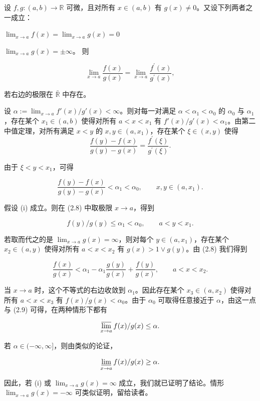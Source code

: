 \begin{proposition}

设 $ f, g: (a, b) \to \mathbb{R} $ 可微，且对所有 $ x \in (a, b) $ 有 $ g(x) \neq 0 $。又设下列两者之一成立：

\begin{subitems}
\item

$ \lim_{x \to a} f(x) = \lim_{x \to a} g(x) = 0 $

\item

$ \lim_{x \to a} g(x) = \pm \infty $。
则

\[
\lim_{x\to a}\frac{f(x)}{g(x)}=\lim_{x\to a}\frac{f^{\prime}(x)}{g^{\prime}(x)},
\]

若右边的极限在 $ \bar{\mathbb{R}} $ 中存在。

\proofhead
设 $\alpha := \lim_{x \to a} f'(x) / g'(x) < \infty$。则对每一对满足 $\alpha < \alpha_1 < \alpha_0$ 的 $\alpha_0$ 与 $\alpha_1$，存在某个 $x_1 \in (a, b)$ 使得对所有 $a < x < x_1$ 有 $f'(x) / g'(x) < \alpha_1$。由第二中值定理，对所有满足 $x < y$ 的 $x, y \in (a, x_1)$，存在某个 $\xi \in (x, y)$ 使得
\begin{equation}
\frac{f(y)-f(x)}{g(y)-g(x)}=\frac{f^{\prime}(\xi)}{g^{\prime}(\xi)}.
\end{equation}

由于 $ \xi < y < x_{1} $，可得

\[
\frac{f(y)-f(x)}{g(y)-g(x)}<\alpha_{1}<\alpha_{0},\qquad x,y\in(a,x_{1}).
\]

假设 (i) 成立。则在 (2.8) 中取极限 $ x \to a $，得到

\begin{equation}
f(y)/g(y)\leq\alpha_{1}<\alpha_{0},\qquad a<y<x_{1}.
\end{equation}

若取而代之的是 $ \lim_{x \to a} g(x) = \infty $，则对每个 $ y \in (a, x_1) $，存在某个 $ x_2 \in (a, y) $ 使得对所有 $ a < x < x_2 $ 有 $ g(x) > 1 \lor g(y) $。由 (2.8) 我们得到

\[
\frac{f(x)}{g(x)}<\alpha_{1}-\alpha_{1}\frac{g(y)}{g(x)}+\frac{f(y)}{g(x)},\qquad a<x<x_{2}.
\]

当 $x \to a$ 时，这个不等式的右边收敛到 $\alpha_1$。因此存在某个 $x_3 \in (a, x_2)$ 使得对所有 $a < x < x_3$ 有 $f(x)/g(x) < \alpha_0$。由于 $\alpha_0$ 可取得任意接近于 $\alpha$，由这一点与 (2.9) 可得，在两种情形下都有

\[
\varlimsup_{x\to a}f(x)/g(x)\leq\alpha.
\]

若 $ \alpha \in (-\infty, \infty] $，则由类似的论证，

\[
\varliminf_{x\to a}f(x)/g(x)\geq\alpha.
\]

因此，若 (i) 或 $ \lim_{x \to a} g(x) = \infty $ 成立，我们就已证明了结论。情形 $ \lim_{x \to a} g(x) = -\infty $ 可类似证明，留给读者。

\end{subitems}

\end{proposition}

